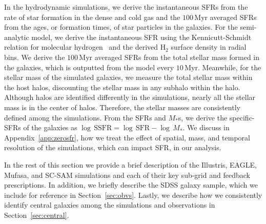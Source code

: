 \documentclass[tighten, preprint]{aastex62}
\begin{document}
In the hydrodynamic simulations, 
{\color{red} we derive the instantaneous SFRs from the rate of star 
formation in the dense and cold gas and the $100\,\mathrm{Myr}$ 
averaged SFRs from the ages, or formation times, of star particles 
in the galaxies}. For the semi-analytic model, we derive 
{\color{red} the instantaneous SFR using the Kennicutt-Schmidt 
relation for molecular hydrogen~\citep{bigiel2008} and the derived 
H$_2$ surface density in radial bins.}
We derive the $100\,\mathrm{Myr}$ averaged SFRs from the total stellar 
mass formed in the galaxies, which is outputted from the model 
every $10\,\mathrm{Myr}$. %
Meanwhile, for the stellar mass of the simulated galaxies, we 
measure the total stellar mass within the host halos, discounting the 
stellar mass in any subhalo within the halo. Although halos are 
identified differently in the simulations, nearly all the stellar 
mass is in the center of halos. Therefore, the stellar masses are
consistently defined among the simulations. 
{\color{red} From the SFRs and $M_*$s, we derive the specific-SFRs of 
the galaxies as $\log\,\mathrm{SSFR} = \log\,\mathrm{SFR} - \log\,M_*$.
We discuss in Appendix~\ref{app:zerosfr}, how we treat the effect of 
spatial, mass, and temporal resolution of the simulations, which can 
impact SFR, in our analysis.}

In the rest of this section we provide a brief description of the 
Illustris, EAGLE, {\sc Mufasa}, and SC-SAM simulations and each 
of their key sub-grid and feedback prescriptions. In addition, we briefly 
describe the
{\color{red} SDSS galaxy sample, which we include for reference in Section~\ref{sec:obvs}.}
Lastly, we describe how we consistently identify central galaxies among 
the simulations and observations in Section~\ref{sec:central}. 

\end{document}

